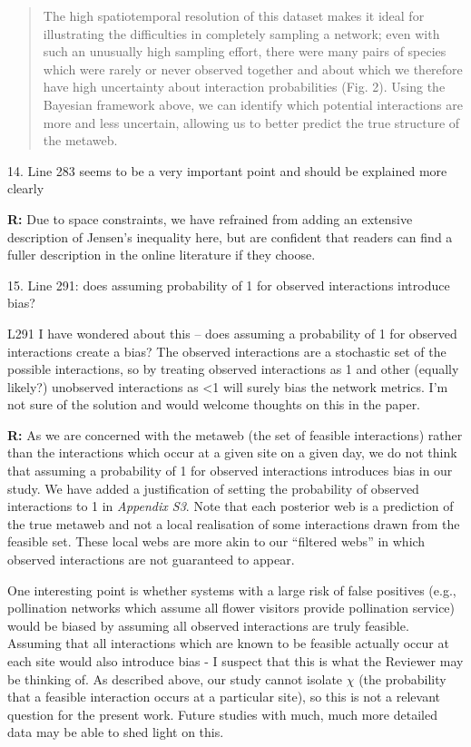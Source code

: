\documentclass[12pt]{letter}
\newenvironment{refquote}{\bigskip \begin{it}}{\end{it}\smallskip}
\begin{document}
		\begin{quotation}
		 The high spatiotemporal resolution of this dataset makes it ideal for illustrating the difficulties in completely sampling a network; even with such an unusually high sampling effort, there were many pairs of species which were rarely or never observed together and about which we therefore have high uncertainty about interaction probabilities (Fig. 2). Using the Bayesian framework above, we can identify which potential interactions are more and less uncertain, allowing us to better predict the true structure of the metaweb. 
		 \end{quotation}


	14. Line 283 seems to be a very important point and should be explained more clearly


		\textbf{R:} Due to space constraints, we have refrained from adding an extensive description of Jensen's inequality here, but are confident that readers can find a fuller description in the online literature if they choose.


	15. Line 291: does assuming probability of 1 for observed interactions introduce bias?


		\begin{refquote}
		L291 I have wondered about this – does assuming a probability of 1 for observed interactions create a bias? The observed interactions are a stochastic set of the possible interactions, so by treating observed interactions as 1 and other (equally likely?) unobserved interactions as \textless1 will surely bias the network metrics. I'm not sure of the solution and would welcome thoughts on this in the paper.
		\end{refquote}


		\textbf{R:} As we are concerned with the metaweb (the set of feasible interactions) rather than the interactions which occur at a given site on a given day, we do not think that assuming a probability of 1 for observed interactions introduces bias in our study. We have added a justification of setting the probability of observed interactions to 1 in \emph{Appendix S3}. Note that each posterior web is a prediction of the true metaweb and not a local realisation of some interactions drawn from the feasible set. These local webs are more akin to our ``filtered webs'' in which observed interactions are not guaranteed to appear. 


		One interesting point is whether systems with a large risk of false positives (e.g., pollination networks which assume all flower visitors provide pollination service) would be biased by assuming all observed interactions are truly feasible. Assuming that all interactions which are known to be feasible actually occur at each site would also introduce bias - I suspect that this is what the Reviewer may be thinking of. As described above, our study cannot isolate $\chi$ (the probability that a feasible interaction occurs at a particular site), so this is not a relevant question for the present work. Future studies with much, much more detailed data may be able to shed light on this.
\end{document}
